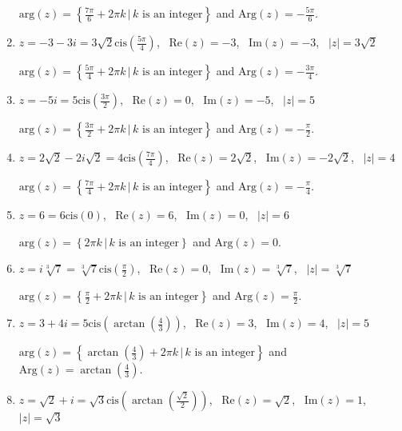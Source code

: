 \documentclass{ximera}
\begin{document}
\begin{enumerate}
$\text{arg}(z) = \left\{\frac{7\pi}{6} + 2\pi k \, | \, \text{$k$ is an integer} \right\}$ and $\text{Arg}(z) = -\frac{5\pi}{6}$.

\item $z = -3-3i = 3\sqrt{2}\text{cis}\left(\frac{5\pi}{4}\right)$, \, $\text{Re}(z) = -3$, \, $\text{Im}(z) =-3$, \, $|z| = 3\sqrt{2}$

$\text{arg}(z) = \left\{\frac{5\pi}{4} + 2\pi k \, | \, \text{$k$ is an integer} \right\}$ and $\text{Arg}(z) = -\frac{3\pi}{4}$.

\item $z = -5i = 5\text{cis}\left(\frac{3\pi}{2}\right)$, \, $\text{Re}(z) = 0$, \, $\text{Im}(z) = -5$, \, $|z| = 5$

$\text{arg}(z) = \left\{\frac{3\pi}{2} + 2\pi k \, | \, \text{$k$ is an integer} \right\}$ and $\text{Arg}(z) = -\frac{\pi}{2}$.

\item $z = 2\sqrt{2} - 2i\sqrt{2} = 4\text{cis}\left(\frac{7\pi}{4}\right)$, \, $\text{Re}(z) = 2\sqrt{2}$, \, $\text{Im}(z) = -2\sqrt{2}$, \, $|z| = 4$

$\text{arg}(z) = \left\{\frac{7\pi}{4} + 2\pi k \, | \, \text{$k$ is an integer} \right\}$ and $\text{Arg}(z) = -\frac{\pi}{4}$.

\item $z =6 = 6\text{cis}\left(0\right)$, \, $\text{Re}(z) = 6$, \, $\text{Im}(z) = 0$, \, $|z| = 6$

$\text{arg}(z) = \left\{2\pi k \, | \, \text{$k$ is an integer} \right\}$ and $\text{Arg}(z) =0$.

\item $z = i \sqrt[3]{7} = \sqrt[3]{7}\text{cis}\left(\frac{\pi}{2}\right)$, \, $\text{Re}(z) =0$, \, $\text{Im}(z) = \sqrt[3]{7}$, \, $|z| = \sqrt[3]{7}$

$\text{arg}(z) = \left\{\frac{\pi}{2} + 2\pi k \, | \, \text{$k$ is an integer} \right\}$ and $\text{Arg}(z) = \frac{\pi}{2}$.

\item $z = 3+4i = 5\text{cis}\left(\arctan\left(\frac{4}{3}\right)\right)$, \, $\text{Re}(z) = 3$, \, $\text{Im}(z) = 4$, \, $|z| = 5$

$\text{arg}(z) = \left\{\arctan\left(\frac{4}{3}\right) + 2\pi k \, | \, \text{$k$ is an integer} \right\}$ and $\text{Arg}(z) =\arctan\left(\frac{4}{3}\right) $.

\item $z = \sqrt{2}+i = \sqrt{3}\text{cis}\left(\arctan\left(\frac{\sqrt{2}}{2}\right)\right)$, \, $\text{Re}(z) = \sqrt{2}$, \, $\text{Im}(z) = 1$, \, $|z| = \sqrt{3}$


\end{enumerate}
\end{document}
